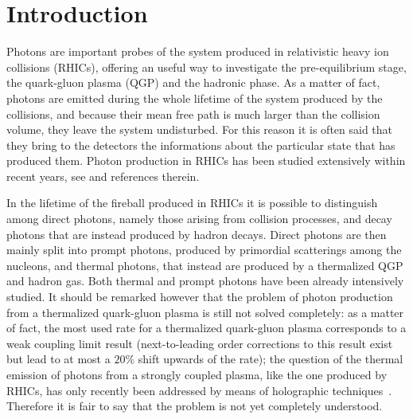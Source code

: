 \documentclass[aps,prc,a4paper,nofootinbib,
preprintnumbers,superscriptaddress,twocolumn,showpacs,showkeys]{revtex4}
\begin{document}





 
\maketitle

\section{Introduction}
Photons are important probes of the system produced in
relativistic heavy ion collisions (RHICs), offering an useful way to investigate the
pre-equilibrium stage, the quark-gluon plasma (QGP) and the hadronic phase.
As a matter of fact, photons are emitted during the whole lifetime of the system produced by the collisions, and 
because their mean free path is much larger than the collision volume,
they leave the system undisturbed. For this reason it is often said that they bring to the detectors the
informations about the particular state that has produced them.
Photon production in RHICs has been studied extensively within recent years,
see \cite{Shen:2013vja,Liu:2007tw,Liu:2008eh,Liu:2014fya,paquet2016,arnold2001,
Turbide:2003si,Linnyk:2015tha,Linnyk:2013wma,Linnyk:2015rco,Berges:2017eom,
Kapusta:1991qp,Baier:1991em,Baier:1991bz,
Ayala:2016lvs,Vovchenko:2016mtf,Chiu:2012ij,Ghiglieri:2016tvj,Ghiglieri:2013gia,
Greif:2016jeb,Iatrakis:2016ugz,Chatterjee:2013naa,Chatterjee:2012dn,Liu:2015vst,Liu:2016ijc,Liu:2012ax}
and references therein. 
 
In the lifetime of the fireball produced in RHICs it is possible 
to distinguish among direct photons, namely those arising from collision processes,
and decay photons that are instead produced by hadron decays. 
Direct photons are then mainly split into prompt photons, produced by primordial 
scatterings among the nucleons, and thermal photons, that instead are produced by a thermalized
QGP and hadron gas. Both thermal and prompt photons have been already intensively studied. 
It should be remarked however that the problem of photon production from a thermalized
quark-gluon plasma is still not solved completely: as a matter of fact, the most used rate for a thermalized
quark-gluon plasma \cite{arnold2001} corresponds to a weak coupling limit result
(next-to-leading order corrections to this result exist~\cite{Ghiglieri:2013gia} but lead to at most
a $20\%$ shift upwards of the rate);
the question of the thermal emission of photons from a strongly coupled plasma,
like the one produced by RHICs, has only recently been 
addressed by means of holographic techniques~\cite{Iatrakis:2016ugz}.
Therefore it is fair to say that the
problem is not yet completely understood. %
\end{document}

